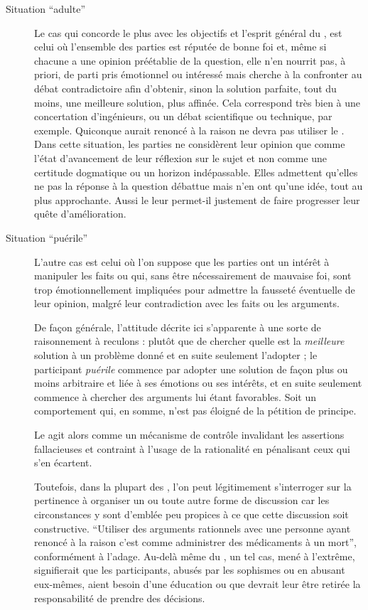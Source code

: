 \begin{description}
  \item[Situation \enquote{adulte}] Le cas qui concorde le plus avec les objectifs et l’esprit général du \mainabbr{}, est celui où l’ensemble des parties est réputée de bonne foi et, même si chacune a une opinion préétablie de la question, elle n’en nourrit pas, à priori, de parti pris émotionnel ou intéressé mais cherche à la confronter au débat contradictoire afin d’obtenir, sinon la solution parfaite, tout du moins, une meilleure solution, plus affinée. Cela correspond très bien à une concertation d’ingénieurs, ou un débat scientifique ou technique, par exemple. Quiconque aurait renoncé à la raison ne devra pas utiliser le \mainabbr{}.
Dans cette situation, les parties ne considèrent leur opinion que comme l’état d’avancement de leur réflexion sur le sujet et non comme une certitude dogmatique ou un horizon indépassable. Elles admettent qu’elles ne  pas la réponse à la question débattue mais n’en ont qu’une idée, tout au plus approchante. Aussi le \mainabbr{} leur permet-il justement de faire progresser leur quête d’amélioration.

  \item[Situation \enquote{puérile}] L’autre cas est celui où l’on suppose que les parties ont un intérêt à manipuler les faits ou qui, sans être nécessairement de mauvaise foi, sont trop émotionnellement impliquées pour admettre la fausseté éventuelle de leur opinion, malgré leur contradiction avec les faits ou les arguments.

  De façon générale, l’attitude décrite ici s’apparente à une sorte de raisonnement à reculons : plutôt que de chercher quelle est la \emph{meilleure} solution à un problème donné et en suite seulement l’adopter ; le participant \emph{puérile} commence par adopter une solution  de façon plus ou moins arbitraire et liée à ses émotions ou ses intérêts, et en suite seulement commence à chercher des arguments lui étant favorables. Soit un comportement qui, en somme, n’est pas éloigné de la pétition de principe.

  Le \mainabbr{} agit alors comme un mécanisme de contrôle invalidant les assertions fallacieuses et contraint à l’usage de la rationalité en pénalisant ceux qui s’en écartent.

  Toutefois, dans la plupart des , l’on peut légitimement s’interroger sur la pertinence à organiser un \mainabbr{} ou toute autre forme de discussion car les circonstances y sont d’emblée peu propices à ce que cette discussion soit constructive. \enquote{Utiliser des arguments rationnels avec une personne ayant renoncé à la raison c’est comme administrer des médicaments à un mort}\nocite{thomasPain1776AmercianCrisis}, conformément à l’adage. Au-delà même du \mainabbr{}, un tel cas, mené à l’extrême, signifierait que les participants, abusés par les sophismes ou en abusant eux-mêmes, aient besoin d’une éducation ou que devrait leur être retirée la responsabilité de prendre des décisions.
\end{description}


